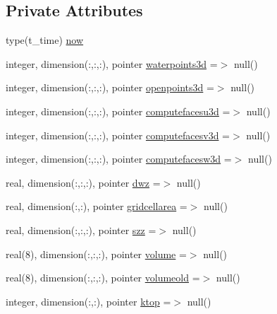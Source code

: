 \subsection*{Private Attributes}
\begin{DoxyCompactItemize}
\item 
type(t\+\_\+time) \mbox{\hyperlink{structmoduleconsolidation_1_1t__external_a13bb9c1d8c43a4509f4ffd1e7914c81c}{now}}
\item 
integer, dimension(\+:,\+:,\+:), pointer \mbox{\hyperlink{structmoduleconsolidation_1_1t__external_a70ce2c2c11a443024f8c56c9474d8471}{waterpoints3d}} =$>$ null()
\item 
integer, dimension(\+:,\+:,\+:), pointer \mbox{\hyperlink{structmoduleconsolidation_1_1t__external_a2d0883fbb10b7433ee557ef54642a081}{openpoints3d}} =$>$ null()
\item 
integer, dimension(\+:,\+:,\+:), pointer \mbox{\hyperlink{structmoduleconsolidation_1_1t__external_a9d019121d572da1893181b7d559249d2}{computefacesu3d}} =$>$ null()
\item 
integer, dimension(\+:,\+:,\+:), pointer \mbox{\hyperlink{structmoduleconsolidation_1_1t__external_a3726b95e442066a5147a099fc34caf71}{computefacesv3d}} =$>$ null()
\item 
integer, dimension(\+:,\+:,\+:), pointer \mbox{\hyperlink{structmoduleconsolidation_1_1t__external_acb00e9fdfea796b713eb3c76bfd83dc8}{computefacesw3d}} =$>$ null()
\item 
real, dimension(\+:,\+:,\+:), pointer \mbox{\hyperlink{structmoduleconsolidation_1_1t__external_a07354e47e1df48137fe4dde05c36a1d5}{dwz}} =$>$ null()
\item 
real, dimension(\+:,\+:), pointer \mbox{\hyperlink{structmoduleconsolidation_1_1t__external_a520a356b99759778824dc6fa218021d3}{gridcellarea}} =$>$ null()
\item 
real, dimension(\+:,\+:,\+:), pointer \mbox{\hyperlink{structmoduleconsolidation_1_1t__external_a93a0f5a54f2b2fd0397f515cac2efd5b}{szz}} =$>$ null()
\item 
real(8), dimension(\+:,\+:,\+:), pointer \mbox{\hyperlink{structmoduleconsolidation_1_1t__external_a266d262ccb884ed3c0a1831c651c47f1}{volume}} =$>$ null()
\item 
real(8), dimension(\+:,\+:,\+:), pointer \mbox{\hyperlink{structmoduleconsolidation_1_1t__external_a3250ed486beca8546f88a33c66b6ca4d}{volumeold}} =$>$ null()
\item 
integer, dimension(\+:,\+:), pointer \mbox{\hyperlink{structmoduleconsolidation_1_1t__external_a80e913134bd13f09074d3b3c1e329eb0}{ktop}} =$>$ null()

\end{DoxyCompactItemize}
